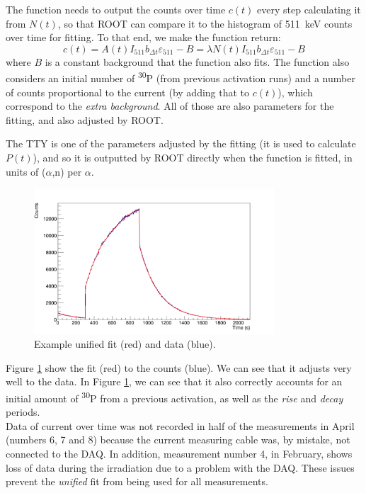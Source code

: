 \documentclass[a4paper,12pt]{report}
\newcommand{\an}{($\alpha$,n) }
\newcommand{\Piso}{\textsuperscript{30}P }
\begin{document}
The function needs to output the counts over time $c(t)$ every step calculating it from $N(t)$, so that ROOT can compare it to the histogram of \qty{511}{\keV} counts over time for fitting.
To that end, we make the function return:
\[ c(t) = A(t)I_{511}b_{\Delta t}\varepsilon_{511} - B = \lambda N(t) I_{511}b_{\Delta t}\varepsilon_{511} - B\]
where $B$ is a constant background that the function also fits.
The function also considers an initial number of \Piso (from previous activation runs) and a number of counts proportional to the current (by adding that to $c(t)$), which correspond to the \textit{extra background}.
All of those are also parameters for the fitting, and also adjusted by ROOT.

The TTY is one of the parameters adjusted by the fitting (it is used to calculate $P(t)$), and so it is outputted by ROOT directly when the function is fitted, in units of \an per $\alpha$.
\\

\begin{figure}[H]
	\centering
	\includegraphics[width=0.80\textwidth]{example_unified_fit.png}
	\caption{Example unified fit (red) and data (blue).}
	\label{example_unified_fit}
\end{figure}

Figure \ref{example_unified_fit} show the fit (red) to the counts (blue).
We can see that it adjusts very well to the data.
In Figure \ref{example_unified_fit}, we can see that it also correctly accounts for an initial amount of \Piso from a previous activation, as well as the \textit{rise} and \textit{decay} periods.
\\

Data of current over time was not recorded in half of the measurements in April (numbers 6, 7 and 8) because the current measuring cable was, by mistake, not connected to the DAQ.
In addition, measurement number 4, in February, shows loss of data during the irradiation due to a problem with the DAQ.
These issues prevent the \textit{unified} fit from being used for all measurements.
\end{document}
